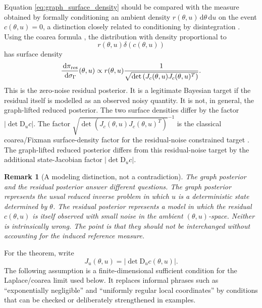 \documentclass[11pt]{article}
\newtheorem{remark}{Remark}
\newcommand{\dd}{\,\mathrm{d}}
\newcommand{\D}{\mathrm{D}}
\newcommand{\abs}[1]{\left\lvert #1\right\rvert}
\newcommand{\sdet}[1]{\sqrt{\det\left(#1\right)}}
\begin{document}
Equation \eqref{eq:graph_surface_density} should be compared with the measure obtained by formally conditioning an ambient density \(r(\theta,u)\dd\theta\dd u\) on the event \(c(\theta,u)=0\), a distinction closely related to conditioning by disintegration \cite{ChangPollard1997}. Using the coarea formula \cite{Federer1969,EvansGariepy2015}, the distribution with density proportional to
\begin{equation}
 r(\theta,u)\delta(c(\theta,u))
\end{equation}
has surface density
\begin{equation}
 \frac{\dd\pi_{\rm res}}{\dd\sigma_\Gamma}(\theta,u)
 \propto
 r(\theta,u)
 \frac{1}{\sdet{J_c(\theta,u)J_c(\theta,u)^T}}.
 \label{eq:residual_surface_density}
\end{equation}
This is the zero-noise residual posterior. It is a legitimate Bayesian target if the residual itself is modelled as an observed noisy quantity. It is not, in general, the graph-lifted reduced posterior. The two surface densities differ by the factor \(\abs{\det\D_u c}\). The factor \(\sdet{J_c(\theta,u)J_c(\theta,u)^T}^{-1}\) is the classical coarea/Fixman surface-density factor for the residual-noise constrained target \cite{Fixman1974,ZappaHolmesCerfonGoodman2018,XuZengPaisleyZhao2026}. The graph-lifted reduced posterior differs from this residual-noise target by the additional state-Jacobian factor \(\abs{\det \D_u c}\).

\begin{remark}[A modeling distinction, not a contradiction]
The graph posterior and the residual posterior answer different questions. The graph posterior represents the usual reduced inverse problem in which \(u\) is a deterministic state determined by \(\theta\). The residual posterior represents a model in which the residual \(c(\theta,u)\) is itself observed with small noise in the ambient \((\theta,u)\)-space. Neither is intrinsically wrong. The point is that they should not be interchanged without accounting for the induced reference measure.
\end{remark}

For the theorem, write
\[
 J_u(\theta,u)=\abs{\det \D_u c(\theta,u)}.
\]
The following assumption is a finite-dimensional sufficient condition for the Laplace/coarea limit used below. It replaces informal phrases such as ``exponentially negligible'' and ``uniformly regular local coordinates'' by conditions that can be checked or deliberately strengthened in examples.
\end{document}
